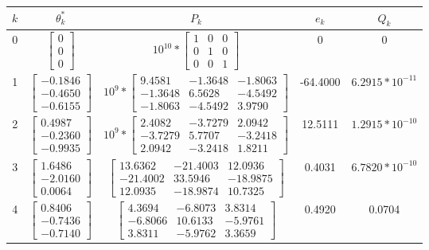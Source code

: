 \begin{table}[h!]
\centering
 \begin{tabular}{|c | c | c | c | c|} 
 \hline
 $k$ & $\theta_{k}^{*}$ & $P_{k}$ & $e_{k}$ &  $Q_{k}$ \\ [0.5ex] 
 \hline\hline
 0 & $ \begin{bmatrix} 0 \\ 0 \\ 0 \end{bmatrix}$ & $ 10^{10} *\begin{bmatrix}  1 & 0 & 0 \\ 0 & 1 & 0 \\ 0 & 0  & 1 \end{bmatrix}$ & 0 & 0 \\ 
 \hline
 1 & $ \begin{bmatrix} -0.1846 \\ -0.4650 \\ -0.6155 \end{bmatrix}$ & $ 10^{9} *\begin{bmatrix}  9.4581 & -1.3648 & -1.8063 \\ -1.3648 & 6.5628 & -4.5492 \\ -1.8063  & -4.5492  & 3.9790 \end{bmatrix}$ & -64.4000 & $6.2915*10^{-11}$ \\ 
 \hline
 2 & $ \begin{bmatrix} 0.4987 \\ -0.2360 \\ -0.9935 \end{bmatrix}$ & $ 10^{9} *\begin{bmatrix}  2.4082 & -3.7279 & 2.0942 \\ -3.7279 & 5.7707 & -3.2418 \\ 2.0942 & -3.2418  & 1.8211 \end{bmatrix}$ & 12.5111 & $1.2915*10^{-10}$ \\ 
 \hline
 3 & $ \begin{bmatrix} 1.6486 \\ -2.0160\\ 0.0064 \end{bmatrix}$ & $\begin{bmatrix}  13.6362 & -21.4003 & 12.0936 \\ -21.4002 & 33.5946 & -18.9875 \\ 12.0935 & -18.9874  & 10.7325 \end{bmatrix}$ & 0.4031 & $6.7820*10^{-10}$ \\ 
  \hline
 4 & $ \begin{bmatrix} 0.8406 \\ -0.7436 \\ -0.7140 \end{bmatrix}$ & $\begin{bmatrix}  4.3694 & -6.8073 & 3.8314 \\ -6.8066 & 10.6133 & -5.9761 \\ 3.8311 & -5.9762  & 3.3659 \end{bmatrix}$ & 0.4920 & 0.0704 \\ [1ex] 

 \hline
 \end{tabular}
\end{table}

